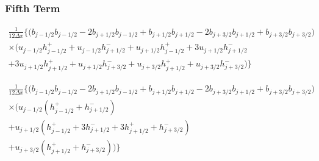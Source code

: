 \documentclass[12pt]{article}
\begin{document}
 \subsubsection{Fifth Term} 
 
 \begin{multline*}
 \frac{1}{12\Delta x} 
 \bigg\lbrace\bigg(b_{j-1/2}b_{j-1/2} - 2b_{j+1/2}b_{j-1/2}+ b_{j+1/2}b_{j+1/2}  - 2b_{j+3/2}b_{j+1/2}  +  b_{j+3/2}b_{j+3/2} \bigg)\\ \times\bigg( u_{j-1/2}h^+_{j-1/2} + u_{j-1/2}h^-_{j+1/2} + u_{j+1/2}h^+_{j-1/2} + 3u_{j+1/2}h^-_{j+1/2} \\+ 3u_{j+1/2} h^+_{j+1/2}  + u_{j+1/2} h^-_{j+3/2} +  u_{j+3/2} h^+_{j+1/2}  + u_{j+3/2}h^-_{j+3/2} \bigg) \bigg\rbrace
 \end{multline*}
 
  \begin{multline*}
  \frac{1}{12\Delta x} 
  \bigg\lbrace\bigg(b_{j-1/2}b_{j-1/2} - 2b_{j+1/2}b_{j-1/2}+ b_{j+1/2}b_{j+1/2}  - 2b_{j+3/2}b_{j+1/2}  +  b_{j+3/2}b_{j+3/2} \bigg)\\ \times\bigg( u_{j-1/2}\left(h^+_{j-1/2} + h^-_{j+1/2} \right) \\ + u_{j+1/2}\left(h^+_{j-1/2} + 3h^-_{j+1/2} + 3 h^+_{j+1/2}  +  h^-_{j+3/2} \right) \\ +  u_{j+3/2} \left(h^+_{j+1/2}  + h^-_{j+3/2} \right) \bigg) \bigg\rbrace
  \end{multline*}
  
 
\end{document}
